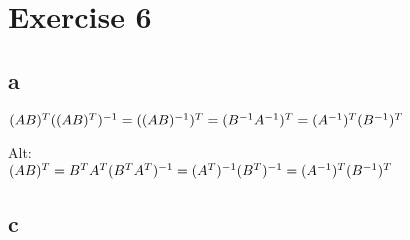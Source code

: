 \documentclass{article}
\begin{document}
\section*{Exercise 6}

\subsection*{a}
$
(AB)^{T}\\
((AB)^{T})^{-1} = \\
((AB)^{-1})^{T} = \\
(B^{-1}A^{-1})^{T} = \\
(A^{-1})^{T}(B^{-1})^{T}
$

Alt:\\
$
(AB)^{T} = B^{T}A^{T}\\
(B^{T}A^{T})^{-1} = \\
(A^{T})^{-1}(B^{T})^{-1} = \\
(A^{-1})^{T}(B^{-1})^{T}
$

\subsection*{c}
\end{document}
